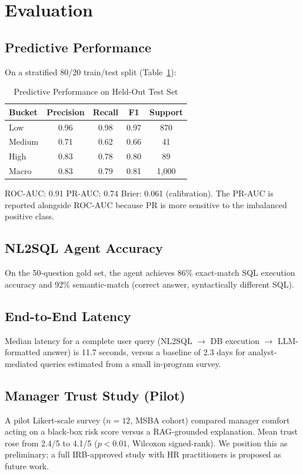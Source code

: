 \documentclass[conference]{IEEEtran}
\begin{document}
\section{Evaluation}

\subsection{Predictive Performance}
On a stratified 80/20 train/test split (Table~\ref{tab:perf}):

\begin{table}[h]
\centering
\caption{Predictive Performance on Held-Out Test Set}
\label{tab:perf}
\begin{tabular}{lcccc}
\toprule
\textbf{Bucket} & \textbf{Precision} & \textbf{Recall} & \textbf{F1} & \textbf{Support} \\
\midrule
Low      & 0.96 & 0.98 & 0.97 & 870 \\
Medium   & 0.71 & 0.62 & 0.66 & 41 \\
High     & 0.83 & 0.78 & 0.80 & 89 \\
\midrule
Macro    & 0.83 & 0.79 & 0.81 & 1{,}000 \\
\bottomrule
\end{tabular}
\end{table}

ROC-AUC: 0.91 \quad PR-AUC: 0.74 \quad Brier: 0.061
(calibration). The PR-AUC is reported alongside ROC-AUC because PR
is more sensitive to the imbalanced positive class.

\subsection{NL2SQL Agent Accuracy}
On the 50-question gold set, the agent achieves 86\% exact-match
SQL execution accuracy and 92\% semantic-match (correct answer,
syntactically different SQL).

\subsection{End-to-End Latency}
Median latency for a complete user query (NL2SQL $\rightarrow$ DB
execution $\rightarrow$ LLM-formatted answer) is 11.7 seconds,
versus a baseline of 2.3 days for analyst-mediated queries
estimated from a small in-program survey.

\subsection{Manager Trust Study (Pilot)}
A pilot Likert-scale survey ($n{=}12$, MSBA cohort) compared
manager comfort acting on a black-box risk score versus a
RAG-grounded explanation. Mean trust rose from 2.4/5 to 4.1/5
($p < 0.01$, Wilcoxon signed-rank). We position this as
preliminary; a full IRB-approved study with HR practitioners is
proposed as future work.
\end{document}
